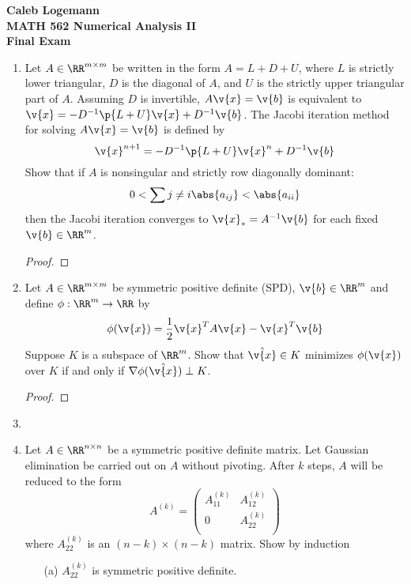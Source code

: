 \documentclass[11pt]{article}
\begin{document}
\noindent \textbf{\Large{Caleb Logemann \\
MATH 562 Numerical Analysis II \\
Final Exam
}}

%
\begin{enumerate}
    \item %
        Let $A \in \RR^{m \times m}$ be written in the form $A = L + D + U$,
        where $L$ is strictly lower triangular, $D$ is the diagonal of $A$, and $U$
        is the strictly upper triangular part of $A$.
        Assuming $D$ is invertible, $A\v{x} = \v{b}$ is equivalent to
        $\v{x} = -D^{-1}\p{L + U}\v{x} + D^{-1}\v{b}$.
        The Jacobi iteration method for solving $A\v{x} = \v{b}$ is defined by
        \[
            \v{x}^{n+1} = -D^{-1}\p{L + U}\v{x}^{n} + D^{-1}\v{b}
        \]
        Show that if $A$ is nonsingular and strictly row diagonally dominant:
        \[
            0 < \sum{j \neq i}{}{\abs{a_{ij}}} < \abs{a_{ii}}
        \]
        then the Jacobi iteration converges to $\v{x}_* = A^{-1}\v{b}$ for each
        fixed $\v{b} \in \RR^m$.

        \begin{proof}
            
        \end{proof}

    \item %
        Let $A \in \RR^{m \times m}$ be symmetric positive definite (SPD),
        $\v{b} \in \RR^m$ and define $\phi:\RR^m \to \RR$ by
        \[
            \phi(\v{x}) = \frac{1}{2}\v{x}^T A \v{x} - \v{x}^T \v{b}
        \]
        Suppose $K$ is a subspace of $\RR^m$.
        Show that $\hat{\v{x}} \in K$ minimizes $\phi(\v{x})$ over $K$ if and
        only if $\nabla \phi(\hat{\v{x}}) \perp K$.

        \begin{proof}
            
        \end{proof}

    \item %

    \item %
        Let $A \in \RR^{n \times n}$ be a symmetric positive definite matrix.
        Let Gaussian elimination be carried out on $A$ without pivoting.
        After $k$ steps, $A$ will be reduced to the form
        \[
            A^{(k)} =
            \begin{pmatrix}
                A_{11}^{(k)} & A_{12}^{(k)} \\
                0            & A_{22}^{(k)} \\
            \end{pmatrix}
        \]
        where $A_{22}^{(k)}$ is an $(n - k) \times (n - k)$ matrix.
        Show by induction
        \begin{enumerate}
            \item[(a)]
                $A_{22}^{(k)}$ is symmetric positive definite.


\end{enumerate}
\end{enumerate}
\end{document}
